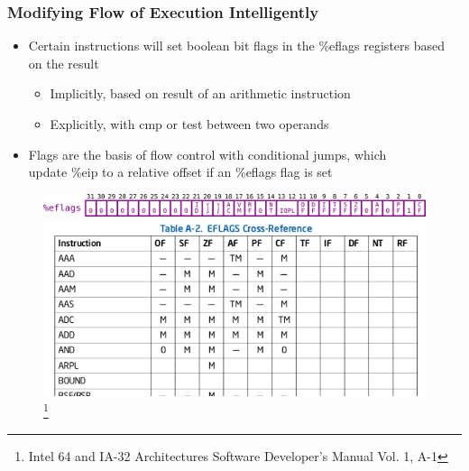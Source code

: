 \documentclass[11pt,xcolor=dvipsnames]{beamer}
\newcommand{\vs}{\vspace{0.5em}}
\newcommand{\mvs}{\vspace{-0.95em}}
\begin{document}
\begin{frame}[fragile,t]
\frametitle{Modifying Flow of Execution Intelligently}
\begin{itemize}
  \item Certain instructions will set boolean bit flags in the {\ttfamily \%eflags} registers based on the result
  \begin{itemize}
    \item Implicitly, based on result of an arithmetic instruction
    \item Explicitly, with {\ttfamily cmp} or {\ttfamily test} between two operands
  \end{itemize}
  \item Flags are the basis of flow control with conditional jumps, which \\ update {\ttfamily \%eip} to a relative offset if an {\ttfamily \%eflags} flag is set
\end{itemize}
\mvs
\begin{figure}
\centering
  \includegraphics[width=\textwidth]{figures/eflags.png} \\
  \vs
  \includegraphics[height=0.3\paperheight]{figures/ia32-eflags.png}\footnote{Intel 64 and IA-32 Architectures Software Developer’s Manual Vol. 1, A-1}
\end{figure}
\end{frame}
\end{document}
